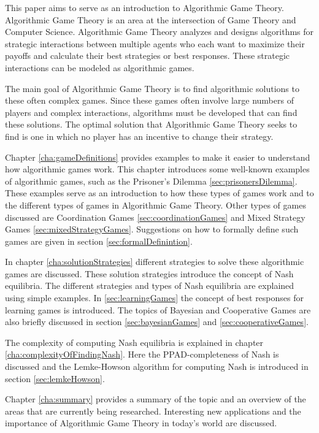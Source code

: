 This paper aims to serve as an introduction to Algorithmic Game Theory. Algorithmic Game Theory is an area at the intersection of Game Theory and Computer Science. Algorithmic Game Theory analyzes and designs algorithms for strategic interactions between multiple agents who each want to maximize their payoffs and calculate their best strategies or best responses. These strategic interactions can be modeled as algorithmic games.

The main goal of Algorithmic Game Theory is to find algorithmic solutions to these often complex games. Since these games often involve large numbers of players and complex interactions, algorithms must be developed that can find these solutions. The optimal solution that Algorithmic Game Theory seeks to find is one in which no player has an incentive to change their strategy.

Chapter \ref{cha:gameDefinitions} provides examples to make it easier to understand how algorithmic games work. This chapter introduces some well-known examples of algorithmic games, such as the Prisoner's Dilemma \ref{sec:prisonersDilemma}. These examples serve as an introduction to how these types of games work and to the different types of games in Algorithmic Game Theory. Other types of games discussed are Coordination Games \ref{sec:coordinationGames} and Mixed Strategy Games \ref{sec:mixedStrategyGames}. Suggestions on how to formally define such games are given in section \ref{sec:formalDefinintion}.

In chapter \ref{cha:solutionStrategies} different strategies to solve these algorithmic games are discussed. These solution strategies introduce the concept of Nash equilibria. The different strategies and types of Nash equilibria are explained using simple examples. In \ref{sec:learningGames} the concept of best responses for learning games is introduced. The topics of Bayesian and Cooperative Games are also briefly discussed in section \ref{sec:bayesianGames} and \ref{sec:cooperativeGames}.

The complexity of computing Nash equilibria is explained in chapter \ref{cha:complexityOfFindingNash}. Here the PPAD-completeness of Nash is discussed and the Lemke-Howson algorithm for computing Nash is introduced in section \ref{sec:lemkeHowson}.

Chapter \ref{cha:summary} provides a summary of the topic and an overview of the areas that are currently being researched. Interesting new applications and the importance of Algorithmic Game Theory in today's world are discussed.

